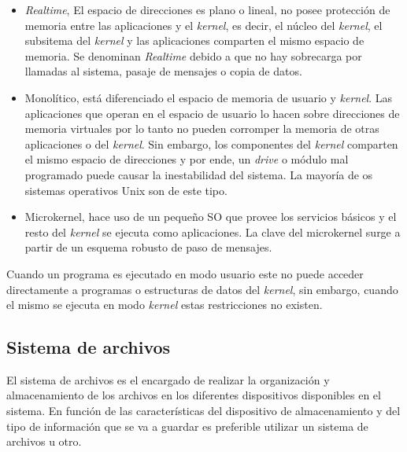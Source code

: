 \begin{itemize}
 \item \emph{Realtime}, El espacio de direcciones es plano o lineal, no posee
protección de memoria entre las aplicaciones y el \emph{kernel}, es decir, el
núcleo del \emph{kernel}, el subsitema del \emph{kernel} y las aplicaciones
comparten el mismo espacio de memoria. Se denominan \emph{Realtime} debido a que
no hay sobrecarga por llamadas al sistema, pasaje de mensajes o copia de datos.

   \item Monolítico, está diferenciado el espacio de memoria de usuario y
\emph{kernel}. Las aplicaciones que operan en el espacio de usuario lo hacen
sobre direcciones de memoria virtuales por lo tanto no pueden corromper la
memoria de otras aplicaciones o del \emph{kernel}. Sin embargo, los componentes 
del \emph{kernel} comparten el mismo espacio de direcciones y por ende, un
\emph{drive} o módulo mal programado puede causar la inestabilidad del sistema.
La mayoría de os sistemas operativos Unix son de este tipo.                    
            

  \item Microkernel,  hace uso de un pequeño SO que provee los servicios básicos
y el resto del \emph{kernel} se ejecuta como aplicaciones. La clave del
microkernel surge a partir de un esquema robusto de paso de mensajes.

\end{itemize}

Cuando un programa es ejecutado en modo usuario este no puede acceder
directamente a programas o estructuras de datos del \emph{kernel}, sin embargo,
cuando el mismo se ejecuta en modo \emph{kernel} estas restricciones no existen.


\subsection{Sistema de archivos}

El sistema de archivos es el encargado de realizar la organización y
almacenamiento de los archivos en los diferentes dispositivos disponibles en el
sistema. En función de las características del dispositivo de almacenamiento y
del tipo de información que se va a guardar es preferible utilizar un sistema de
archivos u otro.

